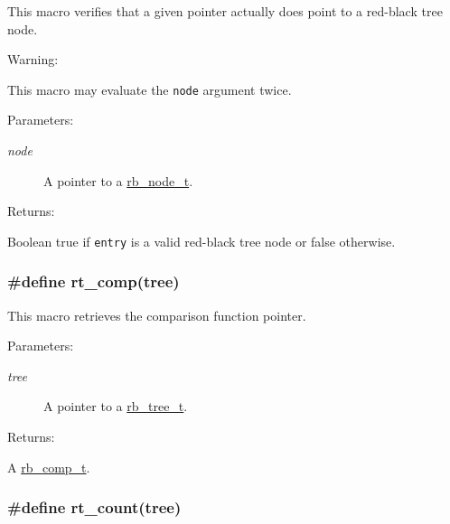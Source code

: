 This macro verifies that a given pointer actually does point to a red-black tree node.

\begin{Desc}
\item[Warning: ]\par
This macro may evaluate the {\tt node} argument twice.\end{Desc}
\begin{Desc}
\item[Parameters: ]\par
\begin{description}
\item[{\em 
node}]A pointer to a \hyperlink{group__dbprim__rbtree_a1}{rb\_\-node\_\-t}.\end{description}
\end{Desc}
\begin{Desc}
\item[Returns: ]\par
Boolean true if {\tt entry} is a valid red-black tree node or false otherwise. \end{Desc}
\hypertarget{group__dbprim__rbtree_a19}{
\subsubsection[rt\_\-comp]{\setlength{\rightskip}{0pt plus 5cm}\#define rt\_\-comp(tree)}}
\label{group__dbprim__rbtree_a19}


This macro retrieves the comparison function pointer.\begin{Desc}
\item[Parameters: ]\par
\begin{description}
\item[{\em 
tree}]A pointer to a \hyperlink{group__dbprim__rbtree_a0}{rb\_\-tree\_\-t}.\end{description}
\end{Desc}
\begin{Desc}
\item[Returns: ]\par
A \hyperlink{group__dbprim__rbtree_a3}{rb\_\-comp\_\-t}. \end{Desc}
\hypertarget{group__dbprim__rbtree_a17}{
\subsubsection[rt\_\-count]{\setlength{\rightskip}{0pt plus 5cm}\#define rt\_\-count(tree)}}
\label{group__dbprim__rbtree_a17}


